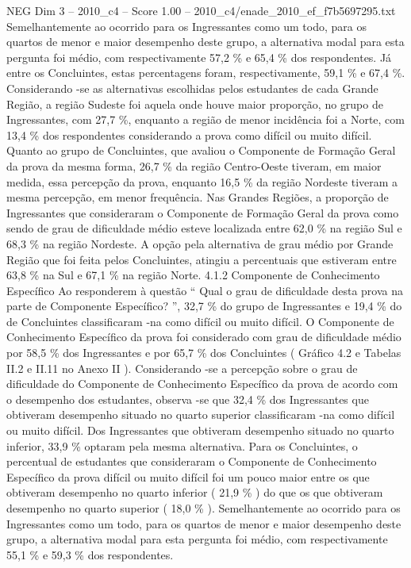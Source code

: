 \begin{textsample}{NEG Dim 3 – 2010\_c4 – Score 1.00 – 2010\_c4/enade\_2010\_ef\_f7b5697295.txt}
Semelhantemente ao ocorrido para os Ingressantes como um todo, para os quartos de menor e maior desempenho deste grupo, a alternativa modal para esta pergunta foi médio, com respectivamente 57,2 \% e 65,4 \% dos respondentes.
Já entre os Concluintes, estas percentagens foram, respectivamente, 59,1 \% e 67,4 \%.
Considerando -se as alternativas escolhidas pelos estudantes de cada Grande Região, a região Sudeste foi aquela onde houve maior proporção, no grupo de Ingressantes, com 27,7 \%, enquanto a região de menor incidência foi a Norte, com 13,4 \% dos respondentes considerando a prova como difícil ou muito difícil.
Quanto ao grupo de Concluintes, que avaliou o Componente de Formação Geral da prova da mesma forma, 26,7 \% da região Centro-Oeste tiveram, em maior medida, essa percepção da prova, enquanto 16,5 \% da região Nordeste tiveram a mesma percepção, em menor frequência.
Nas Grandes Regiões, a proporção de Ingressantes que consideraram o Componente de Formação Geral da prova como sendo de grau de dificuldade médio esteve localizada entre 62,0 \% na região Sul e 68,3 \% na região Nordeste.
A opção pela alternativa de grau médio por Grande Região que foi feita pelos Concluintes, atingiu a percentuais que estiveram entre 63,8 \% na Sul e 67,1 \% na região Norte. 4.1.2 Componente de Conhecimento Específico Ao responderem à questão “ Qual o grau de dificuldade desta prova na parte de Componente Específico? ”, 32,7 \% do grupo de Ingressantes e 19,4 \% do de Concluintes classificaram -na como difícil ou muito difícil.
O Componente de Conhecimento Específico da prova foi considerado com grau de dificuldade médio por 58,5 \% dos Ingressantes e por 65,7 \% dos Concluintes ( Gráfico 4.2 e Tabelas II.2 e II.11 no Anexo II ).
Considerando -se a percepção sobre o grau de dificuldade do Componente de Conhecimento Específico da prova de acordo com o desempenho dos estudantes, observa -se que 32,4 \% dos Ingressantes que obtiveram desempenho situado no quarto superior classificaram -na como difícil ou muito difícil.
Dos Ingressantes que obtiveram desempenho situado no quarto inferior, 33,9 \% optaram pela mesma alternativa.
Para os Concluintes, o percentual de estudantes que consideraram o Componente de Conhecimento Específico da prova difícil ou muito difícil foi um pouco maior entre os que obtiveram desempenho no quarto inferior ( 21,9 \% ) do que os que obtiveram desempenho no quarto superior ( 18,0 \% ).
Semelhantemente ao ocorrido para os Ingressantes como um todo, para os quartos de menor e maior desempenho deste grupo, a alternativa modal para esta pergunta foi médio, com respectivamente 55,1 \% e 59,3 \% dos respondentes.

\end{textsample}
